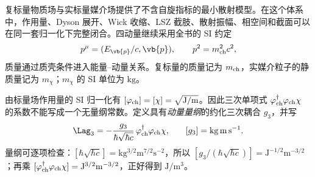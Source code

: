 
复标量物质场与实标量媒介场提供了不含自旋指标的最小散射模型。在这个体系中，作用量、Dyson 展开、Wick 收缩、LSZ 截肢、散射振幅、相空间和截面可以在同一套归一化下完整闭合。四动量继续采用全书的 SI 约定
\begin{equation*}
 p^\mu=(E_{\vb{p}}/c,\vb{p}),\qquad p^2=m_{\rm ch}^2c^2,
\end{equation*}
质量通过质壳条件进入能量--动量关系。复标量的质量记为 $m_{\rm ch}$，实媒介粒子的静质量记为 $m_\chi$；$m_\chi$ 的 SI 单位为 $\mathrm{kg}$。

由标量场作用量的 SI 归一化有 $[\varphi_{\rm ch}]=[\chi]=\sqrt{\mathrm{J/m}}$。因此三次单项式 $\varphi_{\rm ch}^\dagger\varphi_{\rm ch}\chi$ 的系数不能写成一个无量纲常数。定义具有\emph{动量量纲}的约化三次耦合 $g_3$，并写
\begin{equation}
 {
 \Lag_{3}
 =-\frac{g_3}{\hbar\sqrt{\hbar c}}\,\varphi_{\rm ch}^\dagger\varphi_{\rm ch}\chi,}
 \qquad [g_3]=\mathrm{kg\,m\,s^{-1}}.
 \label{eq:scalar-cubic-si-r10}
\end{equation}
量纲可逐项检查：$[\hbar\sqrt{\hbar c}]=\mathrm{kg^{3/2}m^{7/2}s^{-2}}$，所以 $[g_3/(\hbar\sqrt{\hbar c})]=\mathrm{J^{-1/2}m^{-3/2}}$；再乘 $[\varphi_{\rm ch}^\dagger\varphi_{\rm ch}\chi]=\mathrm{J^{3/2}m^{-3/2}}$，正好得到 $\mathrm{J/m^3}$。

